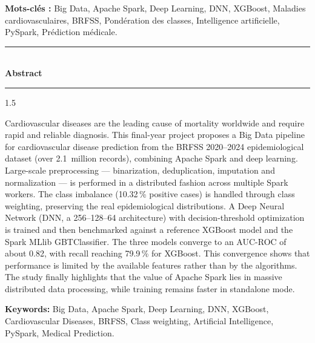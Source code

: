 \documentclass[12pt,a4paper]{report}
\begin{document}
\vspace{0.6cm}
\noindent
\textbf{Mots-clés :} Big Data, Apache Spark, Deep Learning, DNN, XGBoost, Maladies
cardiovasculaires, BRFSS, Pondération des classes, Intelligence artificielle,
PySpark, Prédiction médicale.

\newpage
\thispagestyle{empty}

\vspace{1.2cm}

\begin{center}
    {\color{black}\rule{0.75\textwidth}{1.2pt}}\\[0.4cm]
    {\Huge\bfseries Abstract}\\[0.3cm]
    {\color{black}\rule{0.45\textwidth}{0.6pt}}
\end{center}

\vspace{0.8cm}

\begin{spacing}{1.5}

Cardiovascular diseases are the leading cause of mortality worldwide and require
rapid and reliable diagnosis. This final-year project proposes a Big Data pipeline
for cardiovascular disease prediction from the BRFSS 2020--2024 epidemiological
dataset (over 2.1~million records), combining Apache Spark and deep learning.
Large-scale preprocessing — binarization, deduplication, imputation and
normalization — is performed in a distributed fashion across multiple Spark workers.
The class imbalance (10.32\,\% positive cases) is handled through class weighting,
preserving the real epidemiological distributions. A Deep Neural Network (DNN, a
256--128--64 architecture) with decision-threshold optimization is trained and then
benchmarked against a reference XGBoost model and the Spark MLlib GBTClassifier. The
three models converge to an AUC-ROC of about 0.82, with recall reaching 79.9\,\% for
XGBoost. This convergence shows that performance is limited by the available features
rather than by the algorithms. The study finally highlights that the value of Apache
Spark lies in massive distributed data processing, while training remains faster in
standalone mode.

\end{spacing}

\vspace{0.6cm}
\noindent
\textbf{Keywords:} Big Data, Apache Spark, Deep Learning, DNN, XGBoost, Cardiovascular
Diseases, BRFSS, Class weighting, Artificial Intelligence, PySpark, Medical Prediction.

\vfill


\end{document}
